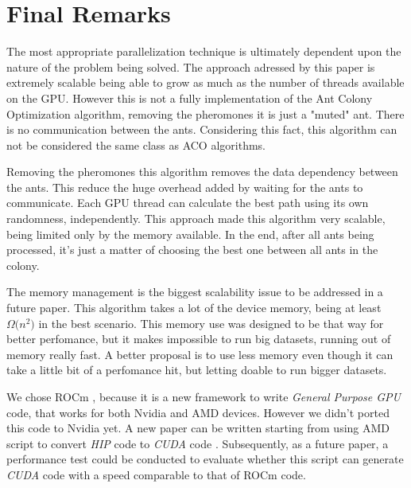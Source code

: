 \section{Final Remarks}

The most appropriate parallelization technique is ultimately dependent upon the
nature of the problem being solved. The approach adressed by this paper
is extremely scalable being able to grow as much as the number of threads available on the GPU.
However this is not a fully implementation of the Ant Colony Optimization algorithm,
removing the pheromones it is just a "muted" ant. There is no communication between the ants.
Considering this fact, this algorithm can not be considered the same class as
ACO algorithms.

Removing the pheromones this algorithm removes the data dependency between the ants.
This reduce the huge overhead added by waiting for the ants to communicate. Each GPU
thread can calculate the best path using its own randomness, independently. This approach made this algorithm
very scalable, being limited only by the memory available. In the end, after all ants
being processed, it's just a matter of choosing the best one between all ants in the colony.

The memory management is the biggest scalability issue to be addressed in a future paper. This algorithm
takes a lot of the device memory, being at least $\Omega({n^{2})}$ in the best scenario.
This memory use was designed to be that way for better perfomance, but it makes impossible to run big datasets, running out
of memory really fast. A better proposal is to use less memory even though it can take a little bit of a perfomance hit, but
letting doable to run bigger datasets.

We chose ROCm \cite{rocm}, because it is a new framework to write \emph{General Purpose GPU} code, that
works for both Nvidia and AMD devices. However we didn't ported this code to Nvidia yet. A new paper can be
written starting from using AMD script to convert \emph{HIP} code to \emph{CUDA}
code \cite{hipifyamd}. Subsequently, as a future paper, a performance test could be conducted to evaluate whether this
script can generate \emph{CUDA} code with a speed comparable to that of ROCm code.
